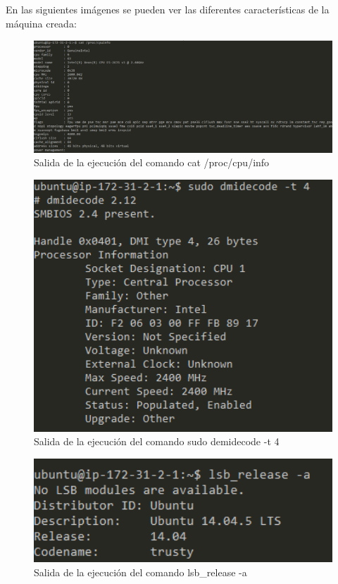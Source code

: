En las siguientes imágenes se pueden ver las diferentes características de la máquina creada:

\begin{figure}[H]
   \centering
   \includegraphics[width=12cm]{img/cpuinfo}
   \caption{Salida de la ejecución del comando cat /proc/cpu/info }
   \label{figura:cpuinfo}
\end{figure}
\begin{figure}[H]
   \centering
   \includegraphics[width=12cm]{img/dmidecode}
   \caption{Salida de la ejecución del comando sudo demidecode -t 4}
   \label{figura:dmidecode}
\end{figure}
\begin{figure}[H]
   \centering
   \includegraphics[width=12cm]{img/lsb_release}
   \caption{Salida de la ejecución del comando lsb\_release -a}
   \label{figura:lsb_release}
\end{figure}
